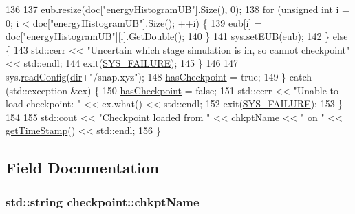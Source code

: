 \begin{DoxyCode}
136 
137             \hyperlink{classcheckpoint_a7071b01d0936873321d0a706e761b6ac}{eub}.resize(doc[\textcolor{stringliteral}{"energyHistogramUB"}].Size(), 0);
138             \textcolor{keywordflow}{for} (\textcolor{keywordtype}{unsigned} \textcolor{keywordtype}{int} i = 0; i < doc[\textcolor{stringliteral}{"energyHistogramUB"}].Size(); ++i) \{
139                 \hyperlink{classcheckpoint_a7071b01d0936873321d0a706e761b6ac}{eub}[i] = doc[\textcolor{stringliteral}{"energyHistogramUB"}][i].GetDouble();
140             \}
141             sys.\hyperlink{classsim_system_ab894de5ccd37efa97ae799f1dc1875a1}{setEUB}(\hyperlink{classcheckpoint_a7071b01d0936873321d0a706e761b6ac}{eub});
142         \} \textcolor{keywordflow}{else} \{
143             std::cerr << \textcolor{stringliteral}{"Uncertain which stage simulation is in, so cannot checkpoint"} << std::endl;
144             exit(\hyperlink{global_8h_a428dfe1ef0a6ff4b1fdebf275f6aff2e}{SYS\_FAILURE});
145         \}
146 
147         sys.\hyperlink{classsim_system_a3161d95bbb800d5d95a732ac5fc32b95}{readConfig}(\hyperlink{classcheckpoint_a0e0f999ee8e0b09541e9131baa8a591d}{dir}+\textcolor{stringliteral}{"/snap.xyz"});
148         \hyperlink{classcheckpoint_aa75f306fcb0c2360d948fa3a61adfed5}{hasCheckpoint} = \textcolor{keyword}{true};
149     \} \textcolor{keywordflow}{catch} (std::exception &ex) \{
150         \hyperlink{classcheckpoint_aa75f306fcb0c2360d948fa3a61adfed5}{hasCheckpoint} = \textcolor{keyword}{false};
151         std::cerr << \textcolor{stringliteral}{"Unable to load checkpoint: "} << ex.what() << std::endl;
152         exit(\hyperlink{global_8h_a428dfe1ef0a6ff4b1fdebf275f6aff2e}{SYS\_FAILURE});
153     \}
154 
155     std::cout << \textcolor{stringliteral}{"Checkpoint loaded from "} << \hyperlink{classcheckpoint_a477eea21621f066889660ed426dc800f}{chkptName} << \textcolor{stringliteral}{" on "} << 
      \hyperlink{utilities_8cpp_aa6d910bf51f18a75deb20c6f0fbba285}{getTimeStamp}() << std::endl;
156 \}
\end{DoxyCode}


\subsection{Field Documentation}
\hypertarget{classcheckpoint_a477eea21621f066889660ed426dc800f}{
\subsubsection[{chkpt\-Name}]{\setlength{\rightskip}{0pt plus 5cm}std\-::string checkpoint\-::chkpt\-Name}}\label{classcheckpoint_a477eea21621f066889660ed426dc800f}


